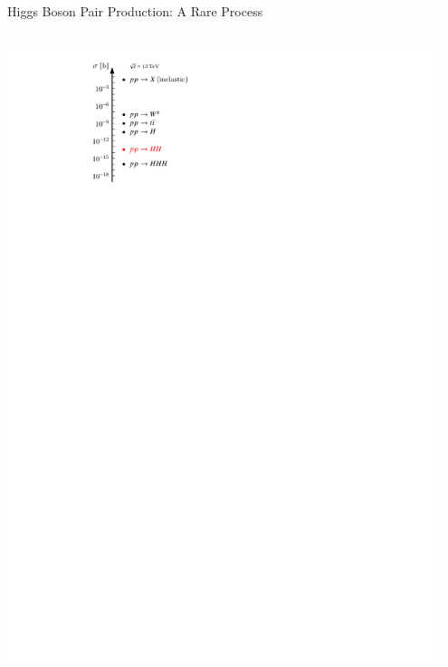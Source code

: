 \documentclass[11pt, xcolor={dvipsnames}, aspectratio=169]{beamer}
\begin{document}
\begin{frame}{Higgs Boson Pair Production: A Rare Process}

  \begin{columns}
    \centering

    \vspace*{1em} \includegraphics[width=0.95\textwidth]{cross_section_figure}


\end{columns}
\end{frame}
\end{document}
